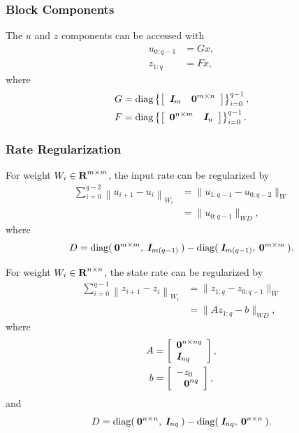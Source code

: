 \documentclass{article}
\begin{document}
    \subsubsection{Block Components}

    The $u$ and $z$ components can be accessed with
    \begin{align*}
        u_{0:q-1}&=Gx,\\
        z_{1:q}&=Fx,
    \end{align*}
    where
    \begin{align*}
        G&=\text{diag}\left\{\left[\begin{array}{lllllllllllllllllll}\emph{\textbf{I}}_m & \textbf{0}^{m\times n}\end{array}\right]\right\}_{i=0}^{q-1},\\
        F&=\text{diag}\left\{\left[\begin{array}{lllllllllllllllllll}\textbf{0}^{n\times m}&\emph{\textbf{I}}_n\end{array}\right]\right\}_{i=0}^{q-1}.
    \end{align*}

    \subsubsection{Rate Regularization} 

    For weight $W_i\in\textbf{R}^{m\times m}$, the input rate can be regularized by
    \begin{align*}
    \sum_{i=0}^{q-2}\left\|u_{i+1}-u_i\right\|_{W_i}
        &=\|u_{1:q-1}-u_{0:q-2}\|_{W}\\
            &=\|u_{0:q-1} \|_{WD},
    \end{align*}
    where \cite[p.~312]{bv_cvxbook}
    \begin{align*}
        D= \text{diag}(\:\textbf{0}^{m\times m},\:\emph{\textbf{I}}_{m(q-1)}\:)-\text{diag}(\:\emph{\textbf{I}}_{m(q-1)},\:\textbf{0}^{m\times m}\:).
    \end{align*}

    For weight $W_i\in\textbf{R}^{n\times n}$, the state rate can be regularized by
    \begin{align*}
    \sum_{i=0}^{q-1}\left\|z_{i+1}-z_i\right\|_{W_i}
        &=\|z_{1:q}-z_{0:q-1}\|_W\\
        &= \|A z_{1:q}-b\|_{WD},
        \end{align*}
    where
    \begin{align*}
        A&=\mat{
                    \zeros^{n\times nq}\\
                    \eye_{nq}
                },\\
        b&=\mat{
                -z_0\\
                \minus\zeros^{nq}
            },
    \end{align*}
    and
    \begin{align*}
        D= \text{diag}(\:\textbf{0}^{n\times n},\:\emph{\textbf{I}}_{nq}\:)-\text{diag}(\:\emph{\textbf{I}}_{nq},\:\textbf{0}^{n\times n}\:).
    \end{align*}
\end{document}
